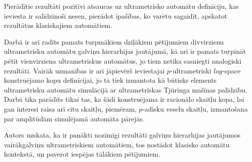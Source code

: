 \documentclass{ludis}
\begin{document}
Pierādītie rezultāti pozitīvi atsaucas uz ultrametrisko automātu definīciju, kas ieviesta ir salīdzinoši nesen, pierādot īpašības, ko varētu sagaidīt, apskatot rezultātus klasiskajiem automātiem.

Darbā ir arī radīts pamats turpmākiem dziļākiem pētījumiem divvirzienu ultrametrisku automātu galviņu hierarhijas jautājumā, kā arī ir pamats turpināt pētīt vienvirziena ultrametriskus automātus, jo tiem netika sasniegti analoģiski rezultāti. Vairāk uzmanības ir arī jāpievērš ieviestajai $p$-ultrametriski $log$-space konstruējamo kopu definīcijai, jo tā tiek izmantota kā būtisks elements ultrametrisku automātu simulācijā ar ultrametriskas Tjūringa mašīnas palīdzību. Darbā tika parādīts tikai tas, ka šādi konstruējama ir racionālo skaitļu kopa, lai gan interesi raisa arī citu skaitļu, piemēram, $p$-adisku veselu skaitļu, izmantošana par amplitūdām simulējamā automāta pārejās.

Autors uzskata, ka ir panākti nozīmīgi rezultāti galviņu hierarhijas jautājumos vairākgalviņu ultrametriskiem automātiem, tos nostādot klasisko automātu kontekstā, un paverot iespējas tālākiem pētījumiem.

\printbibliography
\end{document}
